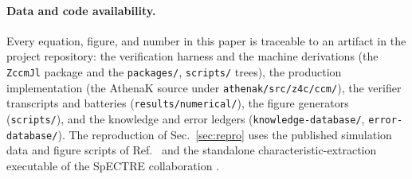 \documentclass[aps,prd,amsmath,floats,floatfix,onecolumn,compact,superscriptaddress,nofootinbib]{revtex4-2}
\begin{document}
\paragraph*{Data and code availability.}
Every equation, figure, and number in this paper is traceable to an
artifact in the project repository: the verification harness and the
machine derivations (the \texttt{ZccmJl} package and the
\texttt{packages/}, \texttt{scripts/} trees), the production
implementation (the AthenaK source under \texttt{athenak/src/z4c/ccm/}),
the verifier transcripts and batteries (\texttt{results/numerical/}), the
figure generators (\texttt{scripts/}), and the knowledge and error
ledgers (\texttt{knowledge-database/}, \texttt{error-database/}). The
reproduction of Sec.~\ref{sec:repro} uses the published simulation data
and figure scripts of Ref.~\cite{Ma:2023qjn} and the standalone
characteristic-extraction executable of the SpECTRE collaboration
\cite{Moxon:2020gha}.





\end{document}
